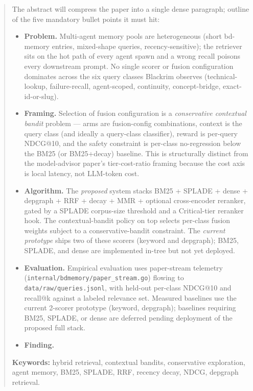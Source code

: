 \begin{abstract}
\noindent
{}

The abstract will compress the paper into a single dense paragraph; outline of
the five mandatory bullet points it must hit:

\begin{itemize}[leftmargin=*]
  \item \textbf{Problem.} Multi-agent memory pools are heterogeneous (short
        bd-memory entries, mixed-shape queries, recency-sensitive); the
        retriever sits on the hot path of every agent spawn and a wrong
        recall poisons every downstream prompt. No single scorer or fusion
        configuration dominates across the six query classes Blackrim
        observes (technical-lookup, failure-recall, agent-scoped, continuity,
        concept-bridge, exact-id-or-slug).
  \item \textbf{Framing.} Selection of fusion configuration is a
        \emph{conservative contextual bandit} problem — arms are
        fusion-config combinations, context is the query class (and ideally
        a query-class classifier), reward is per-query NDCG@10, and the
        safety constraint is per-class no-regression below the BM25 (or
        BM25+decay) baseline. This is structurally distinct from the
        model-advisor paper's tier-cost-ratio framing because the cost axis
        is local latency, not LLM-token cost.
  \item \textbf{Algorithm.} The \emph{proposed} system stacks BM25 +
        SPLADE + dense + depgraph + RRF + decay + MMR + optional
        cross-encoder reranker, gated by a SPLADE corpus-size threshold
        and a Critical-tier reranker hook. The contextual-bandit policy
        on top selects per-class fusion weights subject to a
        conservative-bandit \cite{wu2016conservative,kazerouni2017conservative}
        constraint. The \emph{current prototype} ships two of these
        scorers (keyword and depgraph); BM25, SPLADE, and dense are
        implemented in-tree but not yet deployed.
  \item \textbf{Evaluation.} Empirical evaluation uses paper-stream
        telemetry (\texttt{internal/bdmemory/paper\_stream.go}) flowing to
        \texttt{data/raw/queries.jsonl}, with held-out per-class NDCG@10
        and recall@k against a labeled relevance set. Measured baselines
        use the current 2-scorer prototype (keyword, depgraph); baselines
        requiring BM25, SPLADE, or dense are deferred pending deployment
        of the proposed full stack.
  \item \textbf{Finding.} 
\end{itemize}

\textbf{Keywords:} hybrid retrieval, contextual bandits, conservative
exploration, agent memory, BM25, SPLADE, RRF, recency decay, NDCG,
depgraph retrieval.
\end{abstract}
